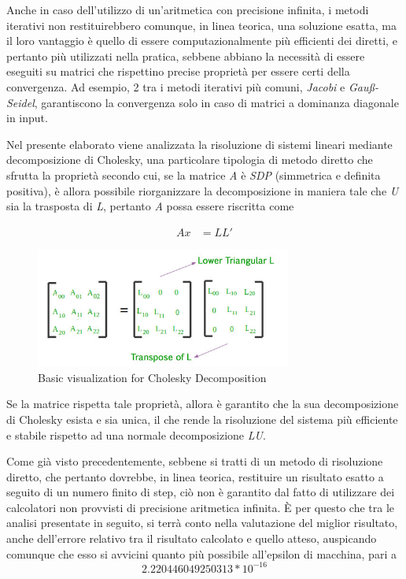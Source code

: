 Anche in caso dell'utilizzo di un'aritmetica con precisione infinita, i metodi iterativi non restituirebbero comunque, in linea teorica, una soluzione esatta, ma il loro vantaggio è quello di essere computazionalmente più efficienti dei diretti, e pertanto più utilizzati nella pratica, sebbene abbiano la necessità di essere eseguiti su matrici che rispettino precise proprietà per essere certi della convergenza. Ad esempio, 2 tra i metodi iterativi più comuni, \textit{Jacobi} e \textit{Gauß-Seidel}, garantiscono la convergenza solo in caso di matrici a dominanza diagonale in input.

Nel presente elaborato viene analizzata la risoluzione di sistemi lineari mediante decomposizione di Cholesky, una particolare tipologia di metodo diretto che sfrutta la proprietà secondo cui, se la matrice \textit{A} è \textit{SDP} (simmetrica e definita positiva), è allora possibile riorganizzare la decomposizione in maniera tale che \textit{U} sia la trasposta di \textit{L}, pertanto \textit{A} possa essere riscritta come

\begin{equation} \label{eq1}
\begin{split}
Ax & = LL'
\end{split}
\end{equation}

\begin{figure}[h!]
    \centering
    \includegraphics[width=0.75\textwidth]{figs/chol_decomposition.jpg}
    \caption{Basic visualization for Cholesky Decomposition}
    \label{fig:cholesky_decomposition}
\end{figure}

Se la matrice rispetta tale proprietà, allora è garantito che la sua decomposizione di Cholesky esista e sia unica, il che rende la risoluzione del sistema più efficiente e stabile rispetto ad una normale decomposizione \textit{LU}.

Come già visto precedentemente, sebbene si tratti di un metodo di risoluzione diretto, che pertanto dovrebbe, in linea teorica, restituire un risultato esatto a seguito di un numero finito di step, ciò non è garantito dal fatto di utilizzare dei calcolatori non provvisti di precisione aritmetica infinita.
È per questo che tra le analisi presentate in seguito, si terrà conto nella valutazione del miglior risultato, anche dell'errore relativo tra il risultato calcolato e quello atteso, auspicando comunque che esso si avvicini quanto più possibile all'epsilon di macchina, pari a
\[
  2.220446049250313*10^{-16}
\]

